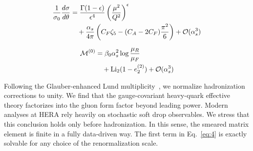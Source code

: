 \begin{align}
  \frac{1}{\sigma_0} \frac{d\sigma}{d\theta} &= \frac{\Gamma(1-\epsilon)}{\epsilon^{4}} \left(\frac{\mu^2}{Q^2}\right)^{\epsilon} \nonumber \\
  &\quad + \frac{\alpha_s}{4\pi} \left( C_F \zeta_{5} - (C_A - 2C_F) \frac{\pi^2}{6} \right) + \mathcal{O}(\alpha_s^3) \label{eq:3}
\end{align}

\begin{align}
  \mathcal{M}^{(0)} &= \beta_0 \alpha_s^2 \log\frac{\mu_R}{\mu_F} \nonumber \\
  &\quad + \mathrm{Li}_{2}(1 - e_2^{(2)}) + \mathcal{O}(\alpha_s^3) \label{eq:4}
\end{align}

Following the Glauber-enhanced Lund
multiplicity~\cite{TPC:1684-Embeddings-Without-Embeddings-October-2-2026},
we normalize hadronization corrections to unity. We find that the
gauge-covariant heavy-quark effective theory factorizes into the gluon
form factor beyond leading power. Modern analyses at HERA rely heavily
on stochastic soft drop observables. We stress that this conclusion
holds only before hadronization. In this sense, the smeared matrix
element is finite in a fully data-driven way. The first term in
Eq.~\eqref{eq:4} is exactly solvable for any choice of the
renormalization scale.

